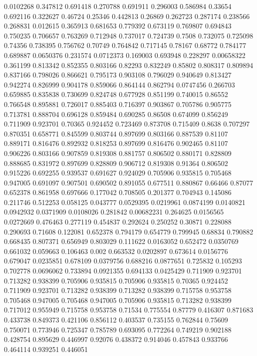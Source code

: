 0.0102268 0.347812
0.691418 0.270788
0.691911 0.296003
0.586984 0.33654
0.692116 0.322627
0.46724 0.25346
0.442813 0.26869
0.262723 0.287174
0.238566 0.268831
0.012615 0.365913
0.681653 0.779392
0.673119 0.769807
0.694843 0.750235
0.706657 0.763269
0.712948 0.737017
0.724739 0.7508
0.732075 0.725098
0.74356 0.738395
0.756762 0.70749
0.764842 0.717145
0.78167 0.68772
0.784177 0.689887
0.0650376 0.231574
0.0712373 0.169003
0.693948 0.228297
0.00658322 0.361199
0.813342 0.852355
0.803166 0.82293
0.832249 0.85802
0.808317 0.809894
0.837166 0.798026
0.866621 0.795173
0.903108 0.796029
0.940649 0.813427
0.942274 0.826999
0.904178 0.859066
0.864144 0.862794
0.0747456 0.266703
0.659885 0.835838
0.730699 0.824748
0.677928 0.851199
0.740015 0.86552
0.766548 0.895881
0.726017 0.885403
0.716397 0.903867
0.705786 0.905775
0.713781 0.888704
0.696128 0.859484
0.690285 0.86508
0.674099 0.856249
0.711909 0.923701
0.70365 0.924452
0.723469 0.873708
0.715409 0.8638
0.707297 0.870351
0.658771 0.845599
0.803744 0.897699
0.803166 0.887539
0.81107 0.889171
0.816476 0.892932
0.818253 0.897699
0.816476 0.902465
0.81107 0.906226
0.803166 0.907859
0.819308 0.881757
0.806502 0.880171
0.828809 0.888685
0.831972 0.897699
0.828809 0.906712
0.819308 0.91364
0.806502 0.915226
0.692255 0.939537
0.691627 0.924029
0.705906 0.935815
0.705468 0.947005
0.691097 0.907501
0.690502 0.891055
0.677511 0.880867
0.66466 0.87077
0.652378 0.861958
0.697666 0.177042
0.708505 0.201377
0.704943 0.145086
0.211746 0.512253
0.058125 0.043777
0.0529395 0.0219961
0.0874199 0.0140821
0.0942932 0.0371909
0.0108026 0.281842
0.00682231 0.264625
0.0156565 0.0272669
0.476463 0.277119
0.454837 0.292624
0.250252 0.30871
0.228088 0.290693
0.71608 0.122081
0.652378 0.794179
0.654779 0.799945
0.68834 0.790882
0.668435 0.807371
0.656949 0.803029
0.111622 0.0163052
0.652472 0.0350769
0.661032 0.059663
0.106463 0.002
0.663532 0.0202897
0.673614 0.0156776
0.679047 0.0235851
0.678109 0.0379756
0.688216 0.0877651
0.725832 0.105293
0.702778 0.0696062
0.733894 0.0921355
0.694133 0.0425429
0.711909 0.923701
0.713282 0.938399
0.705906 0.935815
0.705906 0.935815
0.70365 0.924452
0.711909 0.923701
0.713282 0.938399
0.713282 0.938399
0.715758 0.953758
0.705468 0.947005
0.705468 0.947005
0.705906 0.935815
0.713282 0.938399
0.717012 0.955949
0.715758 0.953758
0.71534 0.775554
0.87779 0.416307
0.871683 0.433738
0.849373 0.421106
0.856112 0.403537
0.735155 0.762844
0.75609 0.750071
0.773946 0.725347
0.785789 0.693095
0.772264 0.749219
0.902188 0.428754
0.895629 0.446997
0.92076 0.438372
0.914046 0.457843
0.933766 0.464114
0.939251 0.446051
